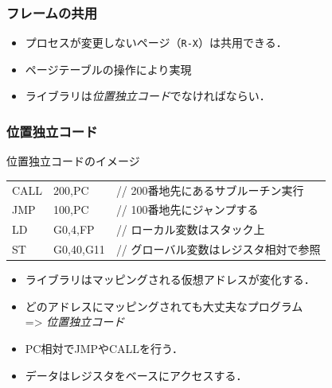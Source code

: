\documentclass[unicode,handout]{beamer}                   %
\begin{document}
\begin{frame}
  \frametitle{フレームの共用}
  \begin{itemize}
  \item プロセスが変更しないページ（\texttt{R-X}）は共用できる．
  \item ページテーブルの操作により実現
  \item ライブラリは\emph{位置独立コード}でなければならい．
  \end{itemize}
\end{frame}

\begin{frame}
  \frametitle{位置独立コード}
  \begin{itembox}[l]{位置独立コードのイメージ}
    \begin{tabular}{l l l}
      CALL  & 200,PC    &   // 200番地先にあるサブルーチン実行    \\
      JMP   & 100,PC    &   // 100番地先にジャンプする            \\
      LD    & G0,4,FP   &   // ローカル変数はスタック上           \\
      ST    & G0,40,G11 &   // グローバル変数はレジスタ相対で参照 \\
    \end{tabular}
  \end{itembox}
  \begin{itemize}
  \item ライブラリはマッピングされる仮想アドレスが変化する．
  \item どのアドレスにマッピングされても大丈夫なプログラム \\
    => \emph{位置独立コード}
  \item PC相対でJMPやCALLを行う．
  \item データはレジスタをベースにアクセスする．
  \end{itemize}
\end{frame}
\end{document}
